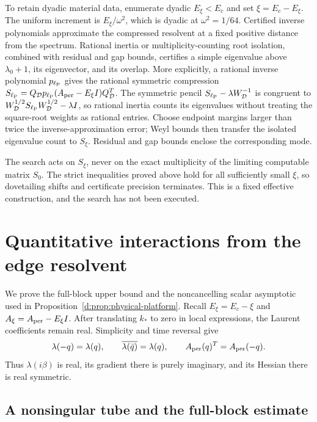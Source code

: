 To retain dyadic material data, enumerate dyadic \(E_\xi<E_c\) and set
\(\xi=E_c-E_\xi\). The uniform increment is \(E_\xi/\omega^2\), which is dyadic at
\(\omega^2=1/64\). Certified inverse polynomials approximate the compressed
resolvent at a fixed positive distance from the spectrum. Rational
inertia or multiplicity-counting root isolation, combined with residual
and gap bounds, certifies a simple eigenvalue above \(\lambda_0+1\), its
eigenvector, and its overlap. More explicitly, a rational inverse
polynomial $p_{\ell_{\rm P}}$ gives the rational symmetric compression
$S_{\ell_{\rm P}}=Q_{\mathcal D}p_{\ell_{\rm P}}(A_{\rm per}-E_\xi I)Q_{\mathcal D}^T$. The symmetric pencil
$S_{\ell_{\rm P}}-\lambda W_{\mathcal D}^{-1}$ is congruent to
$W_{\mathcal D}^{1/2}S_{\ell_{\rm P}}W_{\mathcal D}^{1/2}-\lambda I$, so rational inertia counts its
eigenvalues without treating the square-root weights as rational entries.
Choose endpoint margins larger than twice the inverse-approximation
error; Weyl bounds then transfer the isolated eigenvalue count to
$S_\xi$. Residual and gap bounds enclose the corresponding mode.

The search acts on \(S_\xi\), never on the exact multiplicity of the
limiting computable matrix \(S_0\). The strict inequalities proved above
hold for all sufficiently small \(\xi\), so dovetailing shifts and
certificate precision terminates. This is a fixed effective construction,
and the search has not been executed.

\section{Quantitative interactions from the edge resolvent}
\label{d:app:green}

We prove the full-block upper bound and the noncancelling scalar
asymptotic used in Proposition~\ref{d:prop:physical-platform}. Recall
\(E_\xi=E_c-\xi\) and \(A_\xi=A_{\rm per}-E_\xi I\).
After translating \(k_*\) to zero in local expressions, the Laurent
coefficients remain real. Simplicity and time reversal give
\[
 \lambda(-q)=\lambda(q),\qquad
 \overline{\lambda(\bar q)}=\lambda(q),\qquad
 A_{\rm per}(q)^T=A_{\rm per}(-q).
\]
Thus \(\lambda(i\beta)\) is real, its gradient there is purely imaginary,
and its Hessian there is real symmetric.

\subsection{A nonsingular tube and the full-block estimate}

